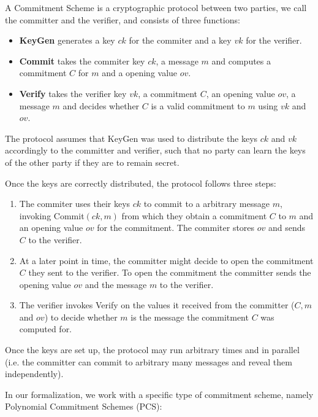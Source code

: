 \begin{definition}
    \label{CS}
    A Commitment Scheme is a cryptographic protocol between two parties, we call the committer and the verifier, and consists of three functions:
    \begin{itemize}
        \item \textbf{KeyGen} generates a key $ck$ for the commiter and a key $vk$ for the verifier.
        \item \textbf{Commit}
        takes the commiter key $ck$, a message $m$ and computes a commitment $C$ for $m$ and a opening value $ov$. 
        \item \textbf{Verify} 
        takes the verifier key $vk$, a commitment $C$, an opening value $ov$, a message $m$ and decides whether $C$ is a valid commitment to $m$ using $vk$ and $ov$.
    \end{itemize}
    \parencite{thalerbook}

    The protocol assumes that KeyGen was used to distribute the keys $ck$ and $vk$ accordingly to the committer and verifier, such that no party can learn the keys of the other party if they are to remain secret. 

    Once the keys are correctly distributed, the protocol follows three steps: 
    \begin{enumerate}
        \item The commiter uses their keys $ck$ to commit to a arbitrary message $m$, invoking Commit$(ck,m)$ from which they obtain a commitment $C$ to $m$ and an opening value $ov$ for the commitment. The commiter stores $ov$ and sends $C$ to the verifier.
        \item At a later point in time, the committer might decide to open the commitment $C$ they sent to the verifier. To open the commitment the committer sends the opening value $ov$ and the message $m$ to the verifier. 
        \item The verifier invokes Verify on the values it received from the committer ($C,m$ and $ov$) to decide whether $m$ is the message the commitment $C$ was computed for. 
    \end{enumerate}
    Once the keys are set up, the protocol may run arbitrary times and in parallel (i.e. the committer can commit to arbitrary many messages and reveal them independently).
\end{definition}

In our formalization, we work with a specific type of commitment scheme, namely Polynomial Commitment Schemes (PCS): 

